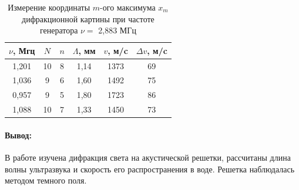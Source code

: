 \documentclass[a4paper,12pt]{article}
\begin{document}
\begin{table}[!h]
\begin{center}
\begin{tabular}{|c|c|c|c|c|c|}
\hline
     $\nu$, Мгц & $N$ & $n$ & $\Lambda$, мм & $v$, м/c & $\Delta v$, м/c \\ \hline
     1,201 & 10 & 8 & 1,14 & 1373 & 69 \\ \hline
     1,036 & 9 &  6 & 1,60 & 1492 & 75 \\ \hline
     0,957 & 9 & 5 & 1,80 & 1723 & 86 \\ \hline
     1,088 & 10 & 7 & 1,33 & 1450 & 73 \\ \hline
    
\end{tabular}
\end{center}
\caption{Измерение координаты $ m $-ого максимума $ x_m $ дифракционной картины при частоте генератора $ \nu = $ 2,883 МГц}
\end{table}

\paragraph{Вывод:}В работе изучена дифракция света на акустической решетки, рассчитаны длина волны ультразвука и скорость его распространения в воде. Решетка наблюдалась методом
темного поля.
\end{document}
